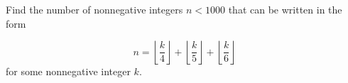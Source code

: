Find the number of nonnegative integers \(n<1000\) that can be written in the form

\[
n=\left\lfloor \dfrac{k}{4}\right\rfloor+\left\lfloor \dfrac{k}{5}\right\rfloor+\left\lfloor \dfrac{k}{6}\right\rfloor
\]for some nonnegative integer \(k\).
